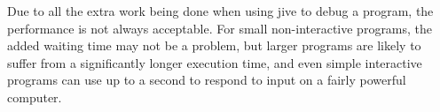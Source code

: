 Due to all the extra work being done when using jive to debug a program, the performance is not always acceptable.
For small non-interactive programs, the added waiting time may not be a problem, but larger programs are likely to suffer from a significantly longer execution time, and even simple interactive programs can use up to a second to respond to input on a fairly powerful computer.
~\\





